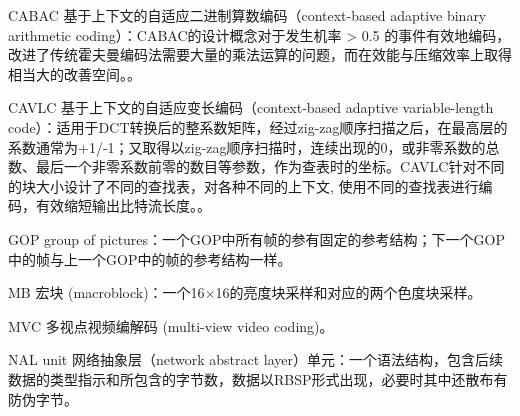 \begin{denotation}

\item[CABAC] 基于上下文的自适应二进制算数编码（context-based adaptive binary arithmetic coding）：CABAC的设计概念对于发生机率 > 0.5 的事件有效地编码，改进了传统霍夫曼编码法需要大量的乘法运算的问题，而在效能与压缩效率上取得相当大的改善空间。。
\item[CAVLC] 基于上下文的自适应变长编码（context-based adaptive variable-length code）：适用于DCT转换后的整系数矩阵，经过zig-zag顺序扫描之后，在最高层的系数通常为+1/-1；又取得以zig-zag顺序扫描时，连续出现的0，或非零系数的总数、最后一个非零系数前零的数目等参数，作为查表时的坐标。CAVLC针对不同的块大小设计了不同的查找表，对各种不同的上下文, 使用不同的查找表进行编码，有效缩短输出比特流长度。。

\item[GOP]	group of pictures：一个GOP中所有帧的参有固定的参考结构；下一个GOP中的帧与上一个GOP中的帧的参考结构一样。

\item[MB]	宏块 (macroblock)：一个16$\times$16的亮度块采样和对应的两个色度块采样。

\item[MVC]	多视点视频编解码 (multi-view video coding)。

\item[NAL unit] 网络抽象层（network abstract layer）单元：一个语法结构，包含后续数据的类型指示和所包含的字节数，数据以RBSP形式出现，必要时其中还散布有防伪字节。

%
%
%

\end{denotation}

\cleardoublepage
